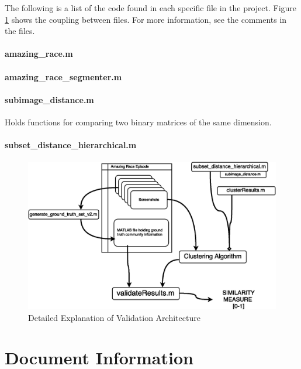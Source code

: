 \documentclass[10pt, twoside]{article}
\begin{document}
The following is a list of the code found in each specific file in the project.
Figure \ref{fig:class_diagram_validate} shows the coupling between files. For more information,
see the comments in the files.

  \paragraph{amazing\_race.m}
  \paragraph{amazing\_race\_segmenter.m}
  \paragraph{subimage\_distance.m}
  Holds functions for comparing two binary matrices of the same dimension.
  \paragraph{subset\_distance\_hierarchical.m}

\begin{figure}[H]
  \centering
  \includegraphics[width=\textwidth]{ClassDiagramValidate}
  \caption{Detailed Explanation of Validation Architecture}
  \label{fig:class_diagram_validate}
\end{figure}

\section{Document Information}
\end{document}

